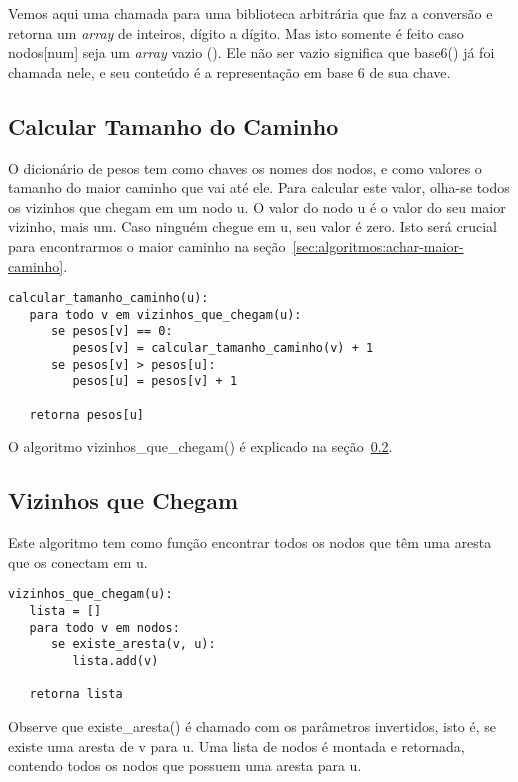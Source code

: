 \documentclass[12pt]{article}
\begin{document}
Vemos aqui uma chamada para uma biblioteca arbitrária que faz a conversão e retorna um \textit{array} de inteiros, dígito a dígito. Mas isto somente é feito caso {\sf nodos[num]} seja um \textit{array} vazio ({\sf []}). Ele não ser vazio significa que {\sf base6()} já foi chamada nele, e seu conteúdo é a representa\c{c}ão em base 6 de sua chave.

\subsection{Calcular Tamanho do Caminho}\label{sec:algoritmos:calcular-tamanho-caminhos}
O dicionário de pesos tem como chaves os nomes dos nodos, e como valores o tamanho do maior caminho que vai até ele.
Para calcular este valor, olha-se todos os vizinhos que chegam em um nodo {\sf u}. O valor do nodo {\sf u} é o valor do seu maior vizinho, mais um. Caso ninguém chegue em {\sf u}, seu valor é zero.
Isto será crucial para encontrarmos o maior caminho na se\c{c}ão~\ref{sec:algoritmos:achar-maior-caminho}.
\begin{lstlisting}
calcular_tamanho_caminho(u):
   para todo v em vizinhos_que_chegam(u):
      se pesos[v] == 0:
         pesos[v] = calcular_tamanho_caminho(v) + 1
      se pesos[v] > pesos[u]:
         pesos[u] = pesos[v] + 1

   retorna pesos[u]
\end{lstlisting}

O algoritmo {\sf vizinhos\_que\_chegam()} é explicado na se\c{c}ão~\ref{sec:algoritmos:vizinhos-que-chegam}.


\subsection{Vizinhos que Chegam}\label{sec:algoritmos:vizinhos-que-chegam}
Este algoritmo tem como fun\c{c}ão encontrar todos os nodos que têm uma aresta que os conectam em {\sf u}.
\begin{lstlisting}
vizinhos_que_chegam(u):
   lista = []
   para todo v em nodos:
      se existe_aresta(v, u):
         lista.add(v)

   retorna lista
\end{lstlisting}

Observe que {\sf existe\_aresta()} é chamado com os parâmetros invertidos, isto é, se existe uma aresta de {\sf v} para {\sf u}.
Uma lista de nodos é montada e retornada, contendo todos os nodos que possuem uma aresta para {\sf u}.
\end{document}
